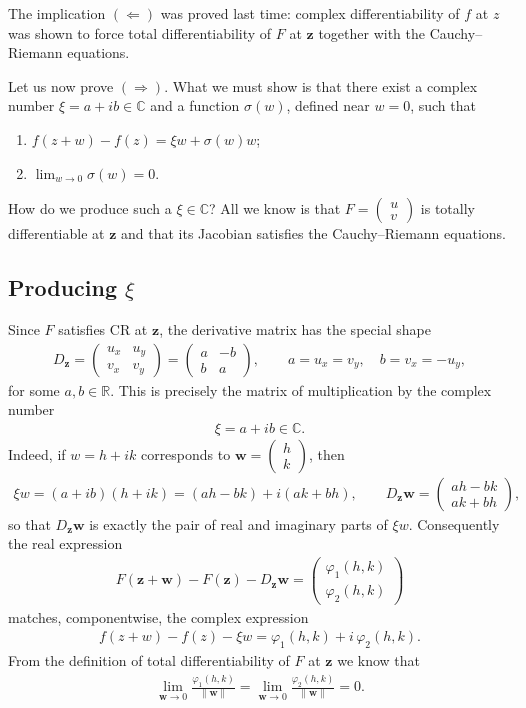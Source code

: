 \documentclass[11pt]{article}
\theoremstyle{plain}
\theoremstyle{definition}
\theoremstyle{remark}
\numberwithin{equation}{section}
\newcommand{\be}{\begin{eqnarray}}
\newcommand{\ee}{\end{eqnarray}}
\newcommand{\C}{\mathbb{C}}
\newcommand{\R}{\mathbb{R}}
\newcommand{\zz}{\mathbf z}
\newcommand{\ww}{\mathbf w}
\begin{document}
The implication $(\Longleftarrow)$ was proved last time: complex
differentiability of $f$ at $z$ was shown to force total differentiability
of $F$ at $\zz$ together with the Cauchy--Riemann equations.

Let us now prove $(\Longrightarrow)$. What we must show is that there exist
a complex number $\xi=a+ib\in\C$ and a function $\sigma(w)$, defined near
$w=0$, such that
\begin{enumerate}
\item $f(z+w)-f(z)=\xi w+\sigma(w)w$;
\item $\displaystyle\lim_{w\to0}\sigma(w)=0$.
\end{enumerate}

How do we produce such a $\xi\in\C$? All we know is that
$F=\begin{pmatrix}u\\v\end{pmatrix}$ is totally differentiable at $\zz$ and
that its Jacobian satisfies the Cauchy--Riemann equations.

\subsection{Producing $\xi$}
Since $F$ satisfies CR at $\zz$, the derivative matrix has the special shape
\be
 D_{\zz}=\begin{pmatrix}u_x&u_y\\v_x&v_y\end{pmatrix}
 =\begin{pmatrix}a&-b\\b&a\end{pmatrix},
 \qquad a=u_x=v_y,\quad b=v_x=-u_y,
\ee
for some $a,b\in\R$. This is precisely the matrix of multiplication by the
complex number
\be
 \boxed{\xi=a+ib\in\C.}
\ee
Indeed, if $w=h+ik$ corresponds to $\ww=\begin{pmatrix}h\\k\end{pmatrix}$, then
\be
 \xi w=(a+ib)(h+ik)=(ah-bk)+i(ak+bh),
 \qquad
 D_{\zz}\ww=\begin{pmatrix}ah-bk\\ak+bh\end{pmatrix},
\ee
so that $D_{\zz}\ww$ is exactly the pair of real and imaginary parts of
$\xi w$. Consequently the real expression
\be
 F(\zz+\ww)-F(\zz)-D_{\zz}\ww
 =\begin{pmatrix}\varphi_1(h,k)\\\varphi_2(h,k)\end{pmatrix}
\ee
matches, componentwise, the complex expression
\be
 f(z+w)-f(z)-\xi w=\varphi_1(h,k)+i\,\varphi_2(h,k).
\ee
From the definition of total differentiability of $F$ at $\zz$ we know that
\be
 \lim_{\ww\to0}\frac{\varphi_1(h,k)}{\|\ww\|}
 =\lim_{\ww\to0}\frac{\varphi_2(h,k)}{\|\ww\|}=0.
\ee
\end{document}

